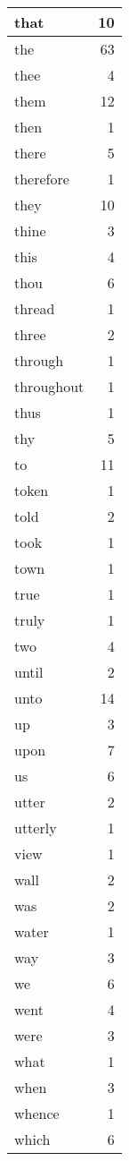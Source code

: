 \begin{center}
\begin{longtable}{l|r}
that & 10 \\ \hline
the & 63 \\ \hline
thee & 4 \\ \hline
them & 12 \\ \hline
then & 1 \\ \hline
there & 5 \\ \hline
therefore & 1 \\ \hline
they & 10 \\ \hline
thine & 3 \\ \hline
this & 4 \\ \hline
thou & 6 \\ \hline
thread & 1 \\ \hline
three & 2 \\ \hline
through & 1 \\ \hline
throughout & 1 \\ \hline
thus & 1 \\ \hline
thy & 5 \\ \hline
to & 11 \\ \hline
token & 1 \\ \hline
told & 2 \\ \hline
took & 1 \\ \hline
town & 1 \\ \hline
true & 1 \\ \hline
truly & 1 \\ \hline
two & 4 \\ \hline
until & 2 \\ \hline
unto & 14 \\ \hline
up & 3 \\ \hline
upon & 7 \\ \hline
us & 6 \\ \hline
utter & 2 \\ \hline
utterly & 1 \\ \hline
view & 1 \\ \hline
wall & 2 \\ \hline
was & 2 \\ \hline
water & 1 \\ \hline
way & 3 \\ \hline
we & 6 \\ \hline
went & 4 \\ \hline
were & 3 \\ \hline
what & 1 \\ \hline
when & 3 \\ \hline
whence & 1 \\ \hline
which & 6 \\ \hline

\end{longtable}
\end{center}
